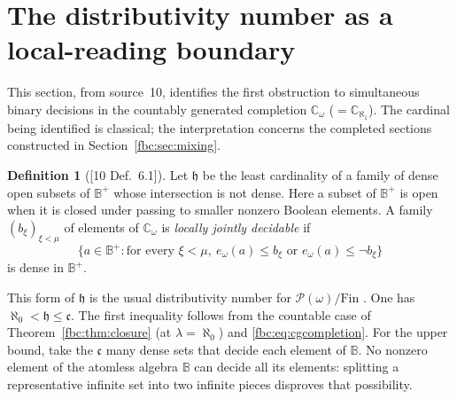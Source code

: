 \documentclass[11pt,letterpaper]{article}
\theoremstyle{definition}
\newtheorem{definition}[theorem]{Definition}
\theoremstyle{remark}
\newcommand{\om}{\omega}
\newcommand{\Fin}{\mathrm{Fin}}
\newcommand{\B}{\mathbb B}
\newcommand{\C}{\mathbb C}
\newcommand{\pow}{\mathcal P}
\newcommand{\cc}{\mathfrak c}
\newcommand{\ch}{\mathfrak h}
\newcommand{\src}[1]{\textup{[#1]}}
\begin{document}
\section{The distributivity number as a local-reading boundary}
\label{fbc:sec:h}

This section, from source~10, identifies the first obstruction to
simultaneous binary decisions in the countably generated completion
$\C_\om$ ($=\C_{\aleph_1}$). The cardinal being identified is classical;
the interpretation concerns the completed sections constructed in
Section~\ref{fbc:sec:mixing}.

\begin{definition}[\src{10 Def.~6.1}]\label{fbc:def:h}
Let $\ch$ be the least cardinality of a family of dense open subsets of
$\B^+$ whose intersection is not dense. Here a subset of $\B^+$ is
open when it is closed under passing to smaller nonzero Boolean elements.
A family $(b_\xi)_{\xi<\mu}$ of elements of $\C_\om$ is
\emph{locally jointly decidable} if
\begin{equation}\label{fbc:eq:joint-decision}
 \{a\in\B^+:\text{for every }\xi<\mu,
 \ e_\om(a)\leq b_\xi\text{ or }e_\om(a)\leq\neg b_\xi\}
\end{equation}
is dense in $\B^+$.
\end{definition}

This form of $\ch$ is the usual distributivity number for
$\pow(\om)/\Fin$ \cite{Blass}. One has $\aleph_0<\ch\leq\cc$. The first
inequality follows from the countable case of
Theorem~\ref{fbc:thm:closure} (at $\lambda=\aleph_0$) and
\eqref{fbc:eq:cgcompletion}. For the upper bound, take the $\cc$ many
dense sets that decide each element of $\B$. No nonzero element of the
atomless algebra $\B$ can decide all its elements: splitting a
representative infinite set into two infinite pieces disproves that
possibility.
\end{document}
